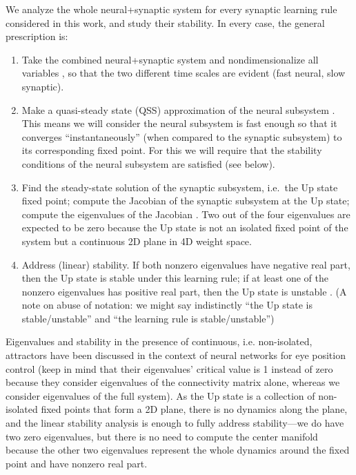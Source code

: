 \documentclass[
twocolumn,
]{article}
\begin{document}
We analyze the whole neural+synaptic system for every synaptic learning rule considered in this work, and study their stability. In every case, the general prescription is:
\begin{enumerate}
\item Take the combined neural+synaptic system and nondimensionalize all variables \cite[see Sections 1.2 and 1.4 of Ref.\ ][]{Keener1998}\cite[see Section 3.5 of Ref.\ ][]{Strogatz2018}, so that the two different time scales are evident (fast neural, slow synaptic).
\item Make a quasi-steady state (QSS) approximation of the neural subsystem \cite{Keener1998,Strogatz2018}. This means we will consider the neural subsystem is fast enough so that it converges ``instantaneously'' (when compared to the synaptic subsystem) to its corresponding fixed point. 
For this we will require that the stability conditions of the neural subsystem are satisfied (see below).
\item Find the steady-state solution of the synaptic subsystem, i.e.\ the Up state fixed point; compute the Jacobian of the synaptic subsystem at the Up state; compute the eigenvalues of the Jacobian \cite{Strogatz2018,Wiggins1996}. Two out of the four eigenvalues are expected to be zero because the Up state is not an isolated fixed point of the system but a continuous 2D plane in 4D weight space.
\item Address (linear) stability. If both nonzero eigenvalues have negative real part, then the Up state is stable under this learning rule; if at least one of the nonzero eigenvalues has positive real part, then the Up state is unstable \cite{Strogatz2018,Wiggins1996}. (A note on abuse of notation: we might say indistinctly ``the Up state is stable/unstable'' and ``the learning rule is stable/unstable'')
\end{enumerate}

Eigenvalues and stability in the presence of continuous, i.e. non-isolated, attractors have been discussed in the context of neural networks for eye position control \cite{Seung1996,Seung1998} (keep in mind that their eigenvalues' critical value is 1 instead of zero because they consider eigenvalues of the connectivity matrix alone, whereas we consider eigenvalues of the full system). As the Up state is a collection of non-isolated fixed points that form a 2D plane, there is no dynamics along the plane, and the linear stability analysis is enough to fully address stability---we do have two zero eigenvalues, but there is no need to compute the center manifold \cite{Wiggins1996} because the other two eigenvalues represent the whole dynamics around the fixed point and have nonzero real part.
\end{document}
